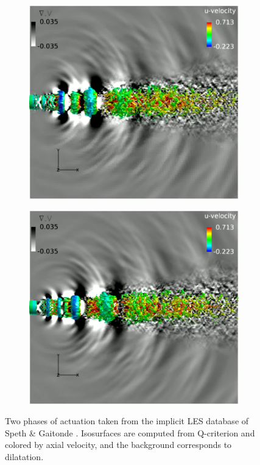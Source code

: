 \begin{figure}
	\centering
	\begin{subfigure}{.5\textwidth}
		\centering
		\includegraphics[width=0.95\linewidth]{Figures/LES_dilatation1.jpg}
		\caption{}
	\end{subfigure}%
	\begin{subfigure}{.5\textwidth}
		\centering
		\includegraphics[width=0.95\linewidth]{Figures/LES_dilatation2.jpg}
		\caption{}
	\end{subfigure}
	\caption{Two phases of actuation taken from the implicit LES database of Speth \& Gaitonde \citep{Speth2014}. Isosurfaces are computed from Q-criterion and colored by axial velocity, and the background corresponds to dilatation.}
	\label{fig:LES_dilatation}
\end{figure}
